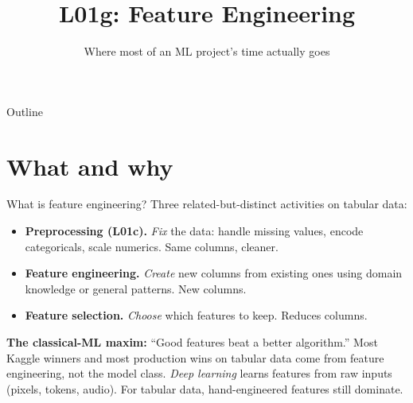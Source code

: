 \documentclass[aspectratio=169]{beamer}
\title{L01g: Feature Engineering}
\subtitle{Where most of an ML project's time actually goes}
\date{}
\begin{document}
\begin{frame}{Outline}
  \tableofcontents
\end{frame}

\section{What and why}

\begin{frame}{What is feature engineering?}
  Three related-but-distinct activities on tabular data:
  \vfill
  \begin{itemize}
    \item \textbf{Preprocessing (L01c).} \emph{Fix} the data: handle missing values, encode categoricals, scale numerics. Same columns, cleaner.
    \item \textbf{Feature engineering.} \emph{Create} new columns from existing ones using domain knowledge or general patterns. New columns.
    \item \textbf{Feature selection.} \emph{Choose} which features to keep. Reduces columns.
  \end{itemize}
  \vfill
  \textbf{The classical-ML maxim:} ``Good features beat a better algorithm.'' Most Kaggle winners and most production wins on tabular data come from feature engineering, not the model class.
  \vfill
  \emph{Deep learning} learns features from raw inputs (pixels, tokens, audio). For tabular data, hand-engineered features still dominate.
\end{frame}
\end{document}
